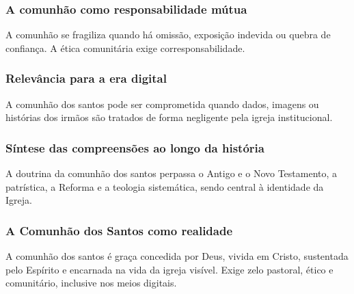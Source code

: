 \subsubsection{A comunhão como responsabilidade mútua}
A comunhão se fragiliza quando há omissão, exposição indevida ou quebra de confiança. A ética comunitária exige corresponsabilidade.

\subsubsection{Relevância para a era digital}
A comunhão dos santos pode ser comprometida quando dados, imagens ou histórias dos irmãos são tratados de forma negligente pela igreja institucional.

\subsubsection{Síntese das compreensões ao longo da história}
A doutrina da comunhão dos santos perpassa o Antigo e o Novo Testamento, a patrística, a Reforma e a teologia sistemática, sendo central à identidade da Igreja.

\subsubsection{A Comunhão dos Santos como realidade}
A comunhão dos santos é graça concedida por Deus, vivida em Cristo, sustentada pelo Espírito e encarnada na vida da igreja visível. Exige zelo pastoral, ético e comunitário, inclusive nos meios digitais.
